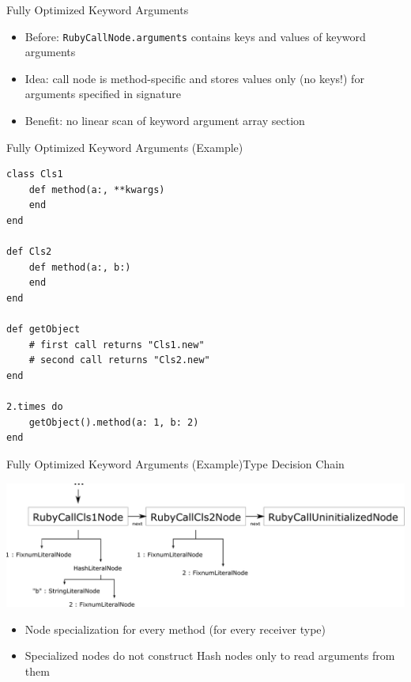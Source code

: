 \documentclass[xcolor=dvipsname,handout]{beamer} %
\begin{document}
\begin{frame}{Fully Optimized Keyword Arguments}
\begin{itemize}
    \item Before: \lstinline{RubyCallNode.arguments} contains keys and values of keyword arguments
    \item Idea: call node is method-specific and stores values only (no keys!) for arguments specified in signature
    \item Benefit: no linear scan of keyword argument array section
\end{itemize}
\end{frame}

\begin{frame}[fragile]{Fully Optimized Keyword Arguments (Example)}
\begin{lstlisting}
class Cls1
    def method(a:, **kwargs)
    end
end

def Cls2
    def method(a:, b:)
    end
end

def getObject
    # first call returns "Cls1.new"
    # second call returns "Cls2.new"
end

2.times do
    getObject().method(a: 1, b: 2)
end
\end{lstlisting}
\end{frame}

\begin{frame}{Fully Optimized Keyword Arguments (Example)}{Type Decision Chain}
\begin{table}
    \centering
    \includegraphics[width=\textwidth]{fully_opt.pdf}
\end{table}

\begin{itemize}
    \item Node specialization for every method (for every receiver type)
    \item Specialized nodes do not construct Hash nodes only to read arguments from them
\end{itemize}
\end{frame}
\end{document}
